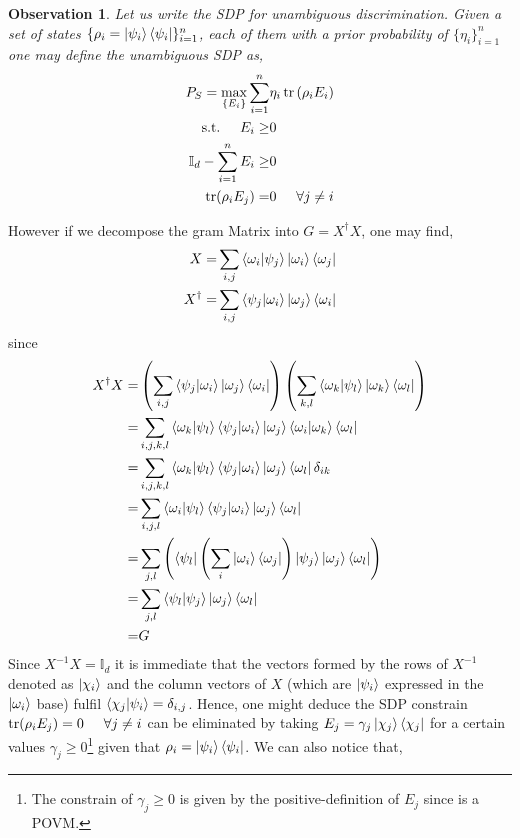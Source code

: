 \documentclass[12pt,letterpaper]{article}
\DeclareMathOperator{\tr}{tr}
\newtheorem{observation}{Observation}
\begin{document}
\begin{multicols}{2}
\begin{observation}
Let us write the SDP for unambiguous discrimination. Given a set of states $\{\rho_i=\ket{\psi_i}\bra{\psi_i}\}_{i=1}^{n}$, each of them with a prior probability of $\{\eta_i\}_{i=1}^{n}$ one may define the unambiguous SDP as,
\begin{align}
P_S=\max_{\{E_i\}}\sum_{i=1}^{n}&\eta_i\tr{(\rho_iE_i)}\\
\text{s.t.}\hspace{0.5cm}E_i\geq&0\\
\mathbb{I}_d-\sum_{i=1}^{n}E_i\geq&0\\
\tr(\rho_iE_j)=&0\hspace{0.5cm}\forall j\neq i
\end{align}
\end{observation}
However if we decompose the gram Matrix into $G=X^\dagger X$, one may find,
\begin{align}
X=&\sum_{i,j}\braket{\omega_i|\psi_j}\ket{\omega_i}\bra{\omega_j}\\
X^\dagger=&\sum_{i,j}\braket{\psi_j|\omega_i}\ket{\omega_j}\bra{\omega_i}
\end{align}
since 
\begin{align}
X^\dagger X=&\left(\sum_{i,j}\braket{\psi_j|\omega_i}\ket{\omega_j}\bra{\omega_i}\right)\left(\sum_{k,l}\braket{\omega_k|\psi_l}\ket{\omega_k}\bra{\omega_l}\right)\\
=&\sum_{i,j,k,l}\braket{\omega_k|\psi_l}\braket{\psi_j|\omega_i}\ket{\omega_j}\braket{\omega_i|\omega_k}\bra{\omega_l}\\
=&\sum_{i,j,k,l}\braket{\omega_k|\psi_l}\braket{\psi_j|\omega_i}\ket{\omega_j}\bra{\omega_l}\delta_{ik}\\
=&\sum_{i,j,l}\braket{\omega_i|\psi_l}\braket{\psi_j|\omega_i}\ket{\omega_j}\bra{\omega_l}\\
=&\sum_{j,l}\left(\bra{\psi_l}\left(\sum_{i}\ket{\omega_{i}}\bra{\omega_j}\right)\ket{\psi_j}\ket{\omega_j}\bra{\omega_l}\right)\\
=&\sum_{j,l}\braket{\psi_l|\psi_j}\ket{\omega_j}\bra{\omega_l}\\
=&G
\end{align}
Since $X^{-1}X=\mathbb{I}_d$ it is immediate that the vectors formed by the rows of $X^{-1}$ denoted as $\ket{\chi_i}$ and the column vectors of $X$ (which are $\ket{\psi_i}$ expressed in the $\ket{\omega_{i}}$ base) fulfil $\braket{\chi_j|\psi_i}=\delta_{i,j}$. Hence, one might deduce the SDP constrain $\tr(\rho_iE_j)=0\hspace{0.5cm}\forall j\neq i$ can be eliminated by taking $E_j=\gamma_j\ket{\chi_j}\bra{\chi_j}$ for a certain values $\gamma_j\geq0$\footnote{The constrain of $\gamma_j\geq 0$ is given by the positive-definition of $E_j$ since is a POVM.} given that $\rho_i=\ket{\psi_i}\bra{\psi_i}$. We can also notice that,

\end{multicols}
\end{document}
